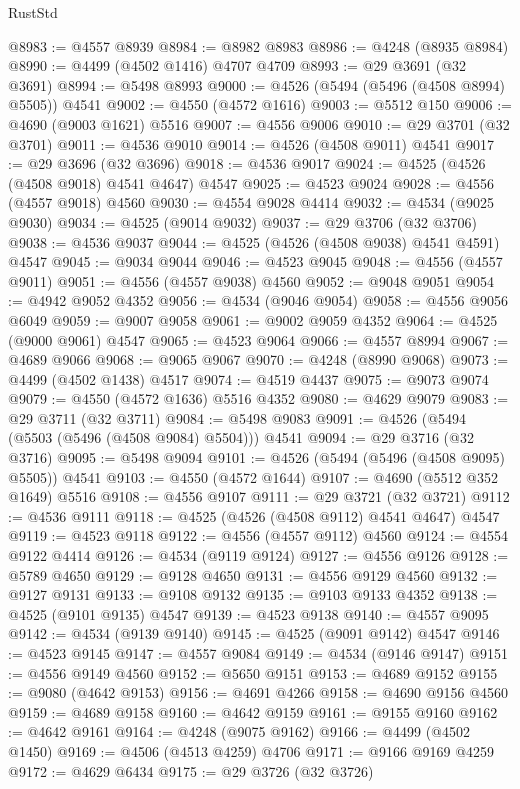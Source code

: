 \begin{lexlean}{RustStd}
\begin{coremodule}
{\begin{coremodule}
{{{{{{{{{{{{{{{{{{{{{{{{{{{{{{{{{{{{{{{{{{{{{{{{{{{{{{{@8983 := @4557 @8939
@8984 := @8982 @8983
@8986 := @4248 (@8935 @8984)
@8990 := @4499 (@4502 @1416) @4707 @4709
@8993 := @29 @3691 (@32 @3691)
@8994 := @5498 @8993
@9000 := @4526 (@5494 (@5496 (@4508 @8994) @5505)) @4541
@9002 := @4550 (@4572 @1616)
@9003 := @5512 @150
@9006 := @4690 (@9003 @1621) @5516
@9007 := @4556 @9006
@9010 := @29 @3701 (@32 @3701)
@9011 := @4536 @9010
@9014 := @4526 (@4508 @9011) @4541
@9017 := @29 @3696 (@32 @3696)
@9018 := @4536 @9017
@9024 := @4525 (@4526 (@4508 @9018) @4541 @4647) @4547
@9025 := @4523 @9024
@9028 := @4556 (@4557 @9018) @4560
@9030 := @4554 @9028 @4414
@9032 := @4534 (@9025 @9030)
@9034 := @4525 (@9014 @9032)
@9037 := @29 @3706 (@32 @3706)
@9038 := @4536 @9037
@9044 := @4525 (@4526 (@4508 @9038) @4541 @4591) @4547
@9045 := @9034 @9044
@9046 := @4523 @9045
@9048 := @4556 (@4557 @9011)
@9051 := @4556 (@4557 @9038) @4560
@9052 := @9048 @9051
@9054 := @4942 @9052 @4352
@9056 := @4534 (@9046 @9054)
@9058 := @4556 @9056 @6049
@9059 := @9007 @9058
@9061 := @9002 @9059 @4352
@9064 := @4525 (@9000 @9061) @4547
@9065 := @4523 @9064
@9066 := @4557 @8994
@9067 := @4689 @9066
@9068 := @9065 @9067
@9070 := @4248 (@8990 @9068)
@9073 := @4499 (@4502 @1438) @4517
@9074 := @4519 @4437
@9075 := @9073 @9074
@9079 := @4550 (@4572 @1636) @5516 @4352
@9080 := @4629 @9079
@9083 := @29 @3711 (@32 @3711)
@9084 := @5498 @9083
@9091 := @4526 (@5494 (@5503 (@5496 (@4508 @9084) @5504))) @4541
@9094 := @29 @3716 (@32 @3716)
@9095 := @5498 @9094
@9101 := @4526 (@5494 (@5496 (@4508 @9095) @5505)) @4541
@9103 := @4550 (@4572 @1644)
@9107 := @4690 (@5512 @352 @1649) @5516
@9108 := @4556 @9107
@9111 := @29 @3721 (@32 @3721)
@9112 := @4536 @9111
@9118 := @4525 (@4526 (@4508 @9112) @4541 @4647) @4547
@9119 := @4523 @9118
@9122 := @4556 (@4557 @9112) @4560
@9124 := @4554 @9122 @4414
@9126 := @4534 (@9119 @9124)
@9127 := @4556 @9126
@9128 := @5789 @4650
@9129 := @9128 @4650
@9131 := @4556 @9129 @4560
@9132 := @9127 @9131
@9133 := @9108 @9132
@9135 := @9103 @9133 @4352
@9138 := @4525 (@9101 @9135) @4547
@9139 := @4523 @9138
@9140 := @4557 @9095
@9142 := @4534 (@9139 @9140)
@9145 := @4525 (@9091 @9142) @4547
@9146 := @4523 @9145
@9147 := @4557 @9084
@9149 := @4534 (@9146 @9147)
@9151 := @4556 @9149 @4560
@9152 := @5650 @9151
@9153 := @4689 @9152
@9155 := @9080 (@4642 @9153)
@9156 := @4691 @4266
@9158 := @4690 @9156 @4560
@9159 := @4689 @9158
@9160 := @4642 @9159
@9161 := @9155 @9160
@9162 := @4642 @9161
@9164 := @4248 (@9075 @9162)
@9166 := @4499 (@4502 @1450)
@9169 := @4506 (@4513 @4259) @4706
@9171 := @9166 @9169 @4259
@9172 := @4629 @6434
@9175 := @29 @3726 (@32 @3726)
}}}}}}}}}}}}}}}}}}}}}}}}}}}}}}}}}}}}}}}}}}}}}}}}}}}}}}}
\end{coremodule}}
\end{coremodule}
\end{lexlean}
